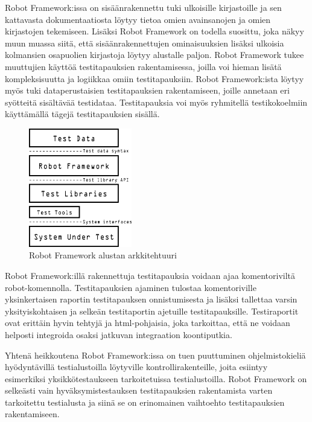     Robot Framework:issa on sisäänrakennettu tuki ulkoisille kirjastoille ja sen kattavasta dokumentaatiosta löytyy tietoa omien avainsanojen ja omien kirjastojen tekemiseen.
    Lisäksi Robot Framework on todella suosittu, joka näkyy muun muassa siitä, että sisäänrakennettujen ominaisuuksien lisäksi ulkoisia kolmansien osapuolien kirjastoja löytyy alustalle paljon.
    Robot Framework tukee muuttujien käyttöä testitapauksien rakentamisessa, joilla voi hieman lisätä kompleksisuutta ja logiikkaa omiin testitapauksiin.
    Robot Framework:ista löytyy myös tuki dataperustaisien testitapauksien rakentamiseen, joille annetaan eri syötteitä sisältävää testidataa.
    Testitapauksia voi myös ryhmitellä testikokoelmiin käyttämällä tägejä testitapauksien sisällä.

    \begin{figure}[H]
      \centering
      \includegraphics[width=0.4\textwidth]{assets/robot-arkkitehtuuri.png}
      \caption{Robot Framework alustan arkkitehtuuri}
      \label{fig:robot-architecture}
    \end{figure}

    Robot Framework:illä rakennettuja testitapauksia voidaan ajaa komentoriviltä robot-komennolla.
    Testitapauksien ajaminen tulostaa komentoriville yksinkertaisen raportin testitapauksen onnistumisesta ja lisäksi tallettaa varsin yksityiskohtaisen ja selkeän testitaportin ajetuille testitapauksille.
    Testiraportit ovat erittäin hyvin tehtyjä ja html-pohjaisia, joka tarkoittaa, että ne voidaan helposti integroida osaksi jatkuvan integraation koontiputkia.

    Yhtenä heikkoutena Robot Framework:issa on tuen puuttuminen ohjelmistokieliä hyödyntävillä testialustoilla löytyville kontrollirakenteille, joita esiintyy esimerkiksi yksikkötestaukseen tarkoitetuissa testialustoilla.
    Robot Framework on selkeästi vain hyväksymistestauksen testitapauksien rakentamista varten tarkoitettu testialusta ja siinä se on erinomainen vaihtoehto testitapauksien rakentamiseen.

